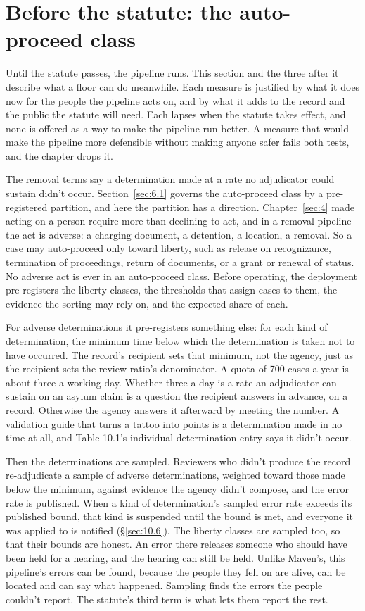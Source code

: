 \section{Before the statute: the auto-proceed class}
\label{sec:10.5}
Until the statute passes, the pipeline runs. This section and the three after it describe what a floor can do meanwhile. Each measure is justified by what it does now for the people the pipeline acts on, and by what it adds to the record and the public the statute will need. Each lapses when the statute takes effect, and none is offered as a way to make the pipeline run better. A measure that would make the pipeline more defensible without making anyone safer fails both tests, and the chapter drops it.

The removal terms say a determination made at a rate no adjudicator could sustain didn't occur. Section~\ref{sec:6.1} governs the auto-proceed class by a pre-registered partition, and here the partition has a direction. Chapter~\ref{sec:4} made acting on a person require more than declining to act, and in a removal pipeline the act is adverse: a charging document, a detention, a location, a removal. So a case may auto-proceed only toward liberty, such as release on recognizance, termination of proceedings, return of documents, or a grant or renewal of status. No adverse act is ever in an auto-proceed class. Before operating, the deployment pre-registers the liberty classes, the thresholds that assign cases to them, the evidence the sorting may rely on, and the expected share of each.

For adverse determinations it pre-registers something else: for each kind of determination, the minimum time below which the determination is taken not to have occurred. The record's recipient sets that minimum, not the agency, just as the recipient sets the review ratio's denominator. A quota of 700 cases a year is about three a working day. Whether three a day is a rate an adjudicator can sustain on an asylum claim is a question the recipient answers in advance, on a record. Otherwise the agency answers it afterward by meeting the number. A validation guide that turns a tattoo into points is a determination made in no time at all, and Table 10.1's individual-determination entry says it didn't occur.

Then the determinations are sampled. Reviewers who didn't produce the record re-adjudicate a sample of adverse determinations, weighted toward those made below the minimum, against evidence the agency didn't compose, and the error rate is published. When a kind of determination's sampled error rate exceeds its published bound, that kind is suspended until the bound is met, and everyone it was applied to is notified (\S\ref{sec:10.6}). The liberty classes are sampled too, so that their bounds are honest. An error there releases someone who should have been held for a hearing, and the hearing can still be held. Unlike Maven's, this pipeline's errors can be found, because the people they fell on are alive, can be located and can say what happened. Sampling finds the errors the people couldn't report. The statute's third term is what lets them report the rest.
